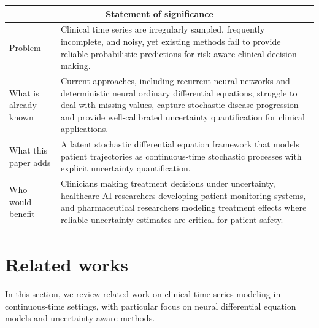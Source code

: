 \documentclass[preprint,12pt]{elsarticle}
\begin{document}
\begin{table}[!ht]
\begin{small}
    \centering 
    \begin{tabularx}{\textwidth}{@{} l X @{}} 
        \toprule
        \multicolumn{2}{c}{\textbf{Statement of significance}} \\
        \midrule
        \midrule
        Problem & Clinical time series are irregularly sampled, frequently incomplete, and noisy, yet existing methods fail to provide reliable probabilistic predictions for risk-aware clinical decision-making. \\
        \midrule
        What is already known & Current approaches, including recurrent neural networks and deterministic neural ordinary differential equations, struggle to deal with missing values, capture stochastic disease progression and provide well-calibrated uncertainty quantification for clinical applications. \\
        \midrule
        What this paper adds & A latent stochastic differential equation framework that models patient trajectories as continuous-time stochastic processes with explicit uncertainty quantification.  \\
        \midrule
        Who would benefit & Clinicians making treatment decisions under uncertainty, healthcare AI researchers developing patient monitoring systems, and pharmaceutical researchers modeling treatment effects where reliable uncertainty estimates are critical for patient safety. \\
        \bottomrule
    \end{tabularx}
    \end{small}
\end{table}
\section{Related works}
In this section, we review related work on clinical time series modeling in continuous-time settings, with particular focus on neural differential equation models and uncertainty-aware methods.
\end{document}
